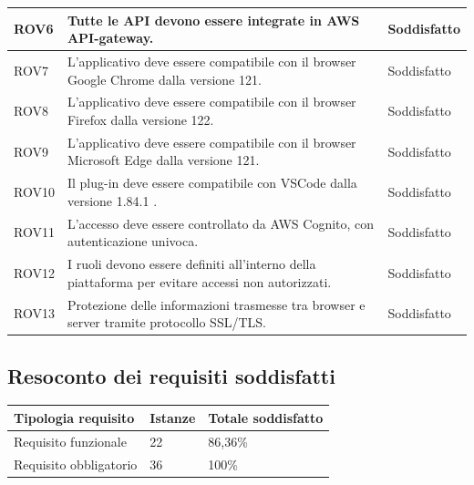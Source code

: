 \documentclass{article}
\begin{document}
\begin{center}
    \begin{tabular}{|P{2cm}| P{10cm}| P{4cm}|}
\hline
{}
ROV6& Tutte le API devono essere integrate in AWS API-gateway.& Soddisfatto\\
\hline
{}
ROV7& L'applicativo deve essere compatibile con il browser Google Chrome dalla versione 121. & Soddisfatto\\
\hline
{}
ROV8& L'applicativo deve essere compatibile con il browser Firefox dalla versione 122. & Soddisfatto\\
\hline
{} 
ROV9 & L'applicativo deve essere compatibile con il browser Microsoft Edge dalla versione 121. & Soddisfatto\\
\hline
{}
ROV10 & Il plug-in deve essere compatibile con VSCode dalla versione 1.84.1 . & Soddisfatto\\
\hline
{}
ROV11 &  L'accesso deve essere controllato da AWS Cognito, con autenticazione univoca. & Soddisfatto\\
\hline
{}
ROV12 & I ruoli devono essere definiti all'interno della piattaforma per evitare accessi non autorizzati. & Soddisfatto\\
\hline
{}
ROV13 & Protezione delle informazioni trasmesse tra browser e server tramite protocollo SSL/TLS. & Soddisfatto\\
\hline
\end{tabular}
\label{tab:reqsodd}
\end{center}

\subsection{Resoconto dei requisiti soddisfatti}
\begin{center}
    \begin{tabular}{|P{7cm}| P{4cm}| P{4cm}|}
    \hline
    Tipologia requisito & Istanze & Totale soddisfatto\\
    \hline
    Requisito funzionale & 22 & 86,36\%\\
    \hline
    Requisito obbligatorio & 36 & 100\% \\
\hline
\end{tabular}
\label{tab:reqsoddrecap}
\end{center}
\end{document}
